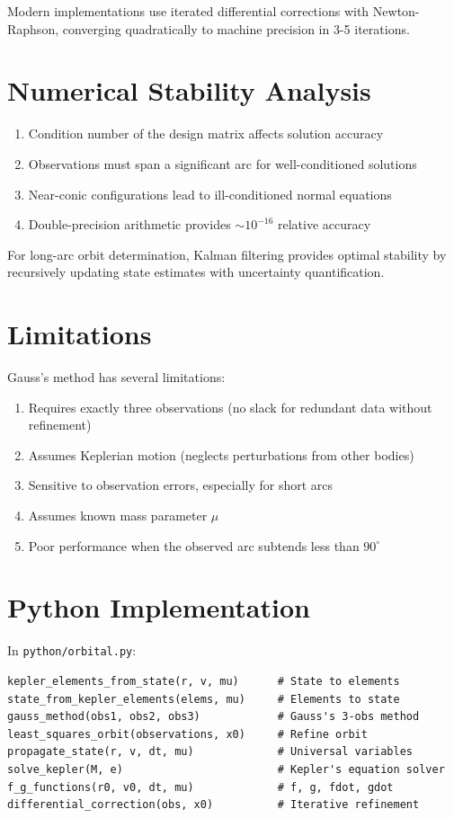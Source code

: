 Modern implementations use iterated differential corrections with Newton-Raphson, converging quadratically to machine precision in 3-5 iterations.

\section{Numerical Stability Analysis}

\begin{enumerate}
    \item Condition number of the design matrix affects solution accuracy
    \item Observations must span a significant arc for well-conditioned solutions
    \item Near-conic configurations lead to ill-conditioned normal equations
    \item Double-precision arithmetic provides $\sim 10^{-16}$ relative accuracy
\end{enumerate}

For long-arc orbit determination, Kalman filtering provides optimal stability by recursively updating state estimates with uncertainty quantification.

\section{Limitations}

Gauss's method has several limitations:
\begin{enumerate}
    \item Requires exactly three observations (no slack for redundant data without refinement)
    \item Assumes Keplerian motion (neglects perturbations from other bodies)
    \item Sensitive to observation errors, especially for short arcs
    \item Assumes known mass parameter $\mu$
    \item Poor performance when the observed arc subtends less than $90^\circ$
\end{enumerate}

\section{Python Implementation}

In \texttt{python/orbital.py}:

\begin{lstlisting}[style=python, caption={Key functions in python/orbital.py}]
kepler_elements_from_state(r, v, mu)      # State to elements
state_from_kepler_elements(elems, mu)     # Elements to state
gauss_method(obs1, obs2, obs3)            # Gauss's 3-obs method
least_squares_orbit(observations, x0)     # Refine orbit
propagate_state(r, v, dt, mu)             # Universal variables
solve_kepler(M, e)                        # Kepler's equation solver
f_g_functions(r0, v0, dt, mu)             # f, g, fdot, gdot
differential_correction(obs, x0)          # Iterative refinement
\end{lstlisting}

